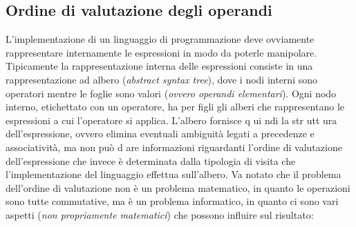 \documentclass[oneside,a4paper,11pt]{book}
\theoremstyle{italicstyle}
\theoremstyle{normStyle}
\begin{document}
\subsection{Ordine di valutazione degli operandi}
L’implementazione di un linguaggio di programmazione deve ovviamente
rappresentare internamente le espressioni in modo da poterle manipolare.
Tipicamente la rappresentazione interna delle espressioni consiste in
una rappresentazione ad albero (\textit{abstract syntax tree}), dove i nodi
interni sono operatori mentre le foglie sono valori (\textit{ovvero operandi elementari}).
Ogni nodo interno, etichettato con un operatore, ha per figli gli
alberi che rappresentano le espressioni a cui l’operatore si applica.
L’albero fornisce q ui ndi la str utt ura dell’espressione, ovvero
elimina eventuali ambiguità legati a precedenze e associatività,
ma non può d are informazioni riguardanti l’ordine di valutazione
dell’espressione che invece è determinata dalla tipologia di visita
che l’implementazione del linguaggio effettua sull'albero. Va
notato che il problema dell’ordine di valutazione non è un problema
matematico, in quanto le operazioni sono tutte commutative, ma è un
problema informatico, in quanto ci sono vari aspetti (\textit{non propriamente
matematici}) che possono influire sul risultato: 
\end{document}
